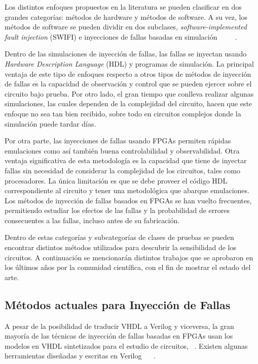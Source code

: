 \documentclass[a4paper,openright,12pt]{report}
\begin{document}
Los distintos enfoques propuestos en la literatura se pueden clasificar en dos grandes categorías: métodos de hardware y métodos de software. A su vez, los métodos de software se pueden dividir en  dos subclases, \textit{software-implemented fault injection} (SWIFI) e inyecciones de fallas basadas en simulación ~\cite{folkesson1998comparison} ~\cite{madeira1994rifle} ~\cite{arlat1990fault}.

Dentro de las simulaciones de inyección de fallas, las fallas se inyectan  usando \textit{Hardware Description Language} (HDL) y programas de simulación. La principal ventaja de este tipo de enfoques respecto a otros tipos de métodos de inyección de fallas es la capacidad de observación y control que se pueden ejercer sobre el circuito bajo prueba. Por otro lado, el gran tiempo que conlleva realizar algunas simulaciones, las cuales dependen de la complejidad del circuito,  hacen que este enfoque no sea tan bien recibido, sobre todo en circuitos complejos donde la simulación puede tardar días.

Por otra parte, las inyecciones de fallas usando  FPGAs permiten rápidas emulaciones como así también buena controlabilidad y observabilidad. Otra ventaja significativa de esta metodología  es la capacidad que tiene de inyectar fallas sin necesidad de considerar la complejidad de los circuitos, tales como procesadores. La única limitación es que se debe proveer el código HDL correspondiente al circuito y tener una metodológica que abarque emulaciones.
Los métodos de inyección de fallas basados en FPGAs se han vuelto frecuentes, permitiendo estudiar los efectos de las fallas y la probabilidad de errores consecuentes a las fallas, incluso antes de su fabricación.

Dentro de estas categorías y subcategorías de clases de pruebas se pueden encontrar distintos métodos  utilizados para descubrir  la sensibilidad de los circuitos. A continuación se mencionarán distintos trabajos que se aprobaron en los últimos años por la comunidad científica,  con el fin de mostrar el estado del arte.





\subsection{Métodos actuales para Inyección de Fallas}

A pesar de la posibilidad de traducir VHDL a Verilog y viceversa, la gran mayoría  de las técnicas de inyección de fallas basadas en FPGAs usan los modelos en VHDL sintetizados para el estudio de circuitos, \cite{614074} \cite{315656} \cite{544533}  ~\cite{689467}.  Existen algunas herramientas diseñadas y escritas en Verilog ~\cite{1267675} ~\cite{1250147}.
\end{document}
